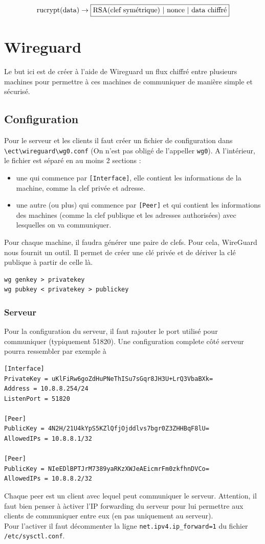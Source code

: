 \documentclass[a4paper, 12pt]{article}
\begin{document}
$$
\text{rucrypt(data)} \rightarrow \fbox{RSA(clef symétrique) | nonce | data chiffré}
$$

\section{Wireguard}
Le but ici est de créer à l'aide de Wireguard un flux chiffré entre plusieurs machines pour permettre à ces machines de communiquer de manière simple et sécurisé.
\subsection{Configuration}
Pour le serveur et les clients il faut créer un fichier de configuration dans \\\verb+\ect\wireguard\wg0.conf+ (On n'est pas obligé de l'appeller \verb+wg0+). A l'intérieur, le fichier est séparé en au moins 2 sections :
\begin{itemize}
\item une qui commence par \verb+[Interface]+, elle contient les informations de la machine, comme la clef privée et adresse.
\item une autre (ou plus) qui commence par \verb+[Peer]+ et qui contient les informations des machines (comme la clef publique et les adresses authorisées) avec lesquelles on va communiquer. \\
\end{itemize}

Pour chaque machine, il faudra générer une paire de clefs. Pour cela, WireGuard nous fournit un outil. Il permet de créer une clé privée et de dériver la clé publique à partir de celle là.

\begin{verbatim}
wg genkey > privatekey
wg pubkey < privatekey > publickey
\end{verbatim}


\subsubsection{Serveur}
Pour la configuration du serveur, il faut rajouter le port utilisé pour communiquer (typiquement 51820). Une configuration complete côté serveur pourra ressembler par exemple à

\begin{verbatim}
[Interface]
PrivateKey = uKlFiRw6goZdHuPNeThISu7sGqr8JH3U+LrQ3VbaBXk= 
Address = 10.8.8.254/24
ListenPort = 51820

[Peer]
PublicKey = 4N2H/21U4kYpS5KZlQfjOjddlvs7bgr0Z3ZHHBqF8lU=
AllowedIPs = 10.8.8.1/32

[Peer] 
PublicKey = NIeEDlBPTJrM7389yaRKzXWJeAEicmrFm0zkfhnDVCo=  
AllowedIPs = 10.8.8.2/32
\end{verbatim}
Chaque peer est un client avec lequel peut communiquer le serveur. Attention, il faut bien penser à àctiver l'IP forwarding du serveur pour lui permettre aux clients de communiquer entre eux (en pas uniquement au serveur). \\
Pour l'activer il faut décommenter la ligne \verb+net.ipv4.ip_forward=1+ du fichier \\\verb+/etc/sysctl.conf+.
\end{document}
